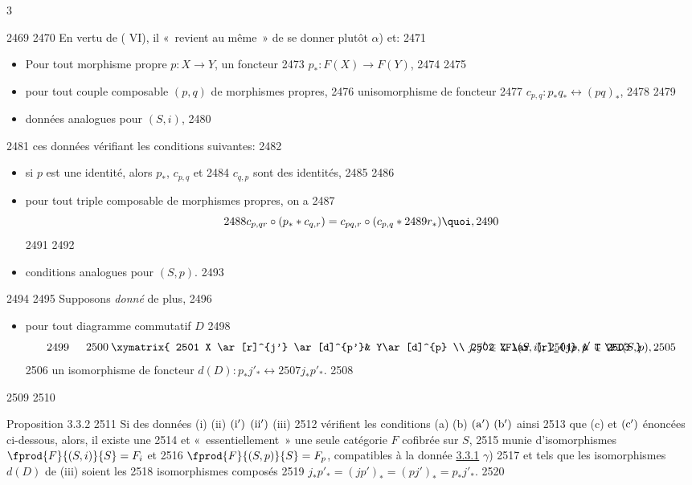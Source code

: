 3	\documentclass[10pt]{../fichiers-configuration-latex/smfart}
\begin{document}
  2469	
  2470	En vertu de ( VI), il « revient au même » de se donner plutôt $\alpha$) et:
  2471	\begin{itemize}
  2472	\item[(i)] Pour tout morphisme propre $p:X\rightarrow Y$, un foncteur
  2473	$p_{\ast}:F(X)\rightarrow F(Y)$,
  2474	
  2475	\item[(ii)] pour tout couple composable $(p,q)$ de morphismes propres,
  2476	un\pageoriginale isomorphisme de foncteur
  2477	$c_{p,q}:p_{\ast}q_{\ast}\leftrightarrow (pq)_{\ast}$,
  2478	
  2479	\item[(i\sisi{}{'}) et (ii\sisi{)'}{')},] données analogues pour $(S,i)$,
  2480	\end{itemize}
  2481	ces données vérifiant les conditions suivantes:
  2482	\begin{itemize}
  2483	\item[(a)] si $p$ est une identité, alors $p_{\ast}$, $c_{p,q}$ et
  2484	$c_{q,p}$ sont des identités,
  2485	
  2486	\item[(b)] pour tout triple composable de morphismes propres, on a
  2487	\[
  2488	c_{p,qr}\circ (p_{\ast}\ast c_{q,r})=c_{pq,r}\circ (c_{p,q}\ast
  2489	r_{\ast}){\quoi},
  2490	\]
  2491	
  2492	\item[(a\sisi{)'}{')} et (b\sisi{)'}{')},] conditions analogues pour $(S,p)$.
  2493	\end{itemize}
  2494	
  2495	Supposons \emph{donné} de plus,
  2496	\begin{itemize}
  2497	\item[(iii)] pour tout diagramme commutatif $D$
  2498	\[
  2499	\vcenter{
  2500	\xymatrix{
  2501	X \ar[r]^{j'} \ar[d]^{p'}& Y\ar[d]^{p} \\
  2502	Z \ar[r]_{j}             &           T
  2503	}}\quad j,j' \in \Fl(S,i)\text{; }
  2504	  p,p' \in \Fl(S,p),
  2505	\]
  2506	un isomorphisme de foncteur $d(D):p_{\ast}j'_{\ast}\leftrightarrow
  2507	j_{\ast}p'_{\ast}$.
  2508	\end{itemize}
  2509	
  2510	\begin{enonce*}{Proposition 3.3.2}
  2511	Si des données {\rm (i) (ii) ${\rm (i')}$ ${\rm (ii')}$ (iii)}
  2512	vérifient les conditions {\rm (a) (b) ${\rm (a')}$ ${\rm (b')}$} ainsi
  2513	que {\rm(c)} et ${\rm (c')}$ énoncées ci-dessous, alors, il existe une
  2514	et « essentiellement »  une seule catégorie $F$ cofibrée sur $S$,
  2515	munie d'isomorphismes $\fprod{F}{(S,i)}{S}=F_i$ et
  2516	$\fprod{F}{(S,p)}{S}=F_p$, compatibles à la donnée \hyperref[XVII.subsubsec3.3.1]{3.3.1} $\gamma$)
  2517	et tels que les isomorphismes $d(D)$ de {\rm(iii)} soient les
  2518	isomorphismes composés
  2519	$j_{\ast}p'_{\ast}=(jp')_{\ast}=(pj')_{\ast}=p_{\ast}j'_{\ast}$.
  2520	\end{enonce*}
\end{document}
